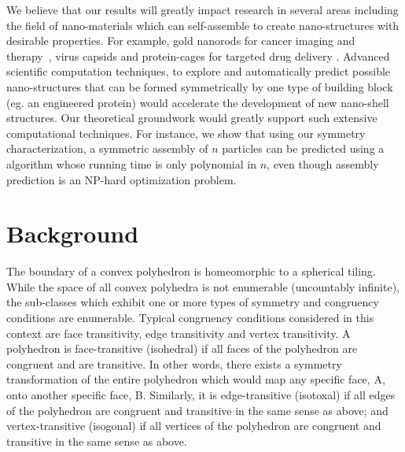 \documentclass[11pt]{article}
\newcommand{\1}{\mathds{1}}
\begin{document}
We believe that our results will greatly impact research in several areas including the field of nano-materials which can self-assemble to create nano-structures with desirable properties. For example, gold nanorods for cancer imaging and therapy~\cite{Chen_2005,XiaGold2014}, virus capsids and protein-cages for targeted drug delivery \cite{Shi_2010,Smith_2013,Steinmetz_2009,Shang_2012}. Advanced scientific computation techniques, to explore and automatically predict possible nano-structures that can be formed symmetrically by one type of building block (eg. an engineered protein) would accelerate the development of new nano-shell structures. Our theoretical groundwork would greatly support such extensive computational techniques. For instance, we show that using our symmetry characterization, a symmetric assembly of $n$ particles can be predicted using a algorithm whose running time is only polynomial in $n$, even though assembly prediction is an NP-hard optimization problem. 

\section{Background}

The boundary of a convex polyhedron is homeomorphic to a spherical tiling. While the space of all convex polyhedra is not enumerable (uncountably infinite), the sub-classes which exhibit one or more types of symmetry and congruency conditions are enumerable. Typical congruency conditions considered in this context are face transitivity, edge transitivity and vertex transitivity. A polyhedron is face-transitive (isohedral) if all faces of the polyhedron are congruent and are transitive. In other words, there exists a symmetry transformation of the entire polyhedron which would map any specific face, A, onto another specific face, B. Similarly, it is edge-transitive (isotoxal) if all edges of the polyhedron are congruent and transitive in the same sense as above; and vertex-transitive (isogonal) if all vertices of the polyhedron are congruent and transitive in the same sense as above.  
\end{document}
